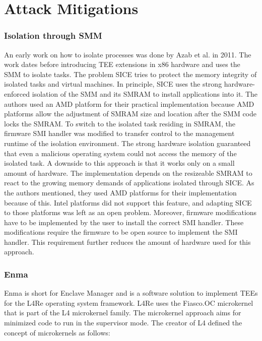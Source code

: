 \section{Attack Mitigations}
\subsubsection{Isolation through SMM}
\label{sec:20:isolation_smm}
An early work on how to isolate processes was done by Azab et al. in
2011.\cite{azab_sice_2011} The work dates before introducing TEE extensions in
x86 hardware and uses the SMM to isolate tasks. The problem SICE tries to
protect the memory integrity of isolated tasks and virtual machines. In
principle, SICE uses the strong hardware-enforced isolation of the SMM and its
SMRAM to install applications into it. The authors used an AMD platform for
their practical implementation because AMD platforms allow the adjustment of
SMRAM size and location after the SMM code locks the SMRAM.\cite{bios2014amd} To
switch to the isolated task residing in SMRAM, the firmware SMI handler was
modified to transfer control to the management runtime of the isolation
environment. The strong hardware isolation guaranteed that even a malicious
operating system could not access the memory of the isolated task. A downside to
this approach is that it works only on a small amount of hardware. The
implementation depends on the resizeable SMRAM to react to the growing memory
demands of applications isolated through SICE. As the authors mentioned, they
used AMD platforms for their implementation because of this. Intel platforms did
not support this feature, and adapting SICE to those platforms was left as an
open problem. Moreover, firmware modifications have to be implemented by the
user to install the correct SMI handler. These modifications require the
firmware to be open source to implement the SMI handler. This requirement
further reduces the amount of hardware used for this approach.

\subsubsection{Enma}
\label{sec:20:enma}
Enma is short for Enclave Manager and is a software solution to implement TEEs
for the L4Re operating system framework. \cite{reitz_isolierende_2019} L4Re uses
the Fiasco.OC microkernel that is part of the L4 microkernel family. The
microkernel approach aims for minimized code to run in the supervisor mode. The
creator of L4 defined the concept of microkernels as follows:


